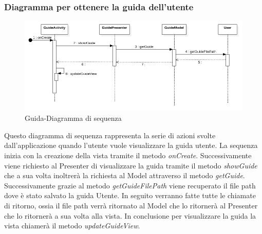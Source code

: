 \subsubsection{Diagramma per ottenere la guida dell'utente}
\begin{figure}[H]
	\centering
	\includegraphics[width=16cm]{res/images/GuideSeq.png}
	\caption{Guida-Diagramma di sequenza}
	\label{fig:Guida-Diagramma di sequenza}
\end{figure}
Questo diagramma di sequenza rappresenta la serie di azioni svolte dall'applicazione quando l'utente vuole visualizzare la guida utente.
La sequenza inizia con la creazione della vista tramite il metodo \textit{onCreate}.
Successivamente viene richiesto al Presenter di visualizzare la guida tramite il metodo \textit{showGuide} che a sua volta inoltrerà la richiesta al Model attraverso il metodo \textit{getGuide}.
Successivamente grazie al metodo \textit{getGuideFilePath} viene recuperato il file path dove è stato salvato la guida Utente.
In seguito verranno fatte tutte le chiamate di ritorno, ossia il file path verrà ritornato al Model che lo ritornerà al Presenter che lo ritornerà a sua volta alla vista.
In conclusione per visualizzare la guida la vista chiamerà il metodo \textit{updateGuideView}.


